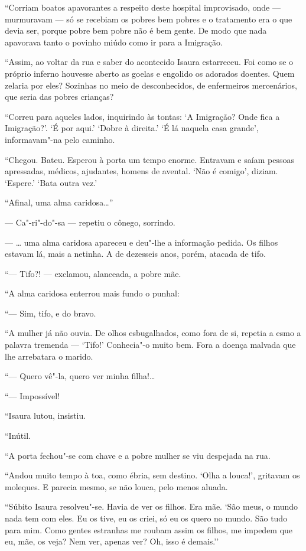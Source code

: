 ``Corriam boatos apavorantes a respeito deste hospital improvisado, onde
--- murmuravam --- só se recebiam os pobres bem pobres e o tratamento
era o que devia ser, porque pobre bem pobre não é bem gente. De modo que
nada apavorava tanto o povinho miúdo como ir para a Imigração.

``Assim, ao voltar da rua e saber do acontecido Isaura estarreceu. Foi
como se o próprio inferno houvesse aberto as goelas e engolido os
adorados doentes. Quem zelaria por eles? Sozinhas no meio de
desconhecidos, de enfermeiros mercenários, que seria das pobres
crianças?

``Correu para aqueles lados, inquirindo às tontas: `A Imigração? Onde
fica a Imigração?'. `É por aqui.' `Dobre à direita.' `É lá naquela casa
grande', informavam"-na pelo caminho.

``Chegou. Bateu. Esperou à porta um tempo enorme. Entravam e saíam
pessoas apressadas, médicos, ajudantes, homens de avental. `Não é
comigo', diziam. `Espere.' `Bata outra vez.'

``Afinal, uma alma caridosa\ldots{}''

--- Ca"-ri"-do"-sa --- repetiu o cônego, sorrindo.

--- \ldots{} uma alma caridosa apareceu e deu"-lhe a informação pedida. Os
filhos estavam lá, mais a netinha. A de dezesseis anos, porém, atacada
de tifo.

``--- Tifo?! --- exclamou, alanceada, a pobre mãe.

``A alma caridosa enterrou mais fundo o punhal:

``--- Sim, tifo, e do bravo.

``A mulher já não ouvia. De olhos esbugalhados, como fora de si, repetia
a esmo a palavra tremenda --- `Tifo!' Conhecia"-o muito bem. Fora a
doença malvada que lhe arrebatara o marido.

``--- Quero vê"-la, quero ver minha filha!\ldots{}

``--- Impossível!

``Isaura lutou, insistiu.

``Inútil.

``A porta fechou"-se com chave e a pobre mulher se viu despejada na rua.

``Andou muito tempo à toa, como ébria, sem destino. `Olha a louca!',
gritavam os moleques. E parecia mesmo, se não louca, pelo menos aluada.

``Súbito Isaura resolveu"-se. Havia de ver os filhos. Era mãe. `São meus,
o mundo nada tem com eles. Eu os tive, eu os criei, só eu os quero no
mundo. São tudo para mim. Como gentes estranhas me roubam assim os
filhos, me impedem que eu, mãe, os veja? Nem ver, apenas ver? Oh, isso é
demais.''

